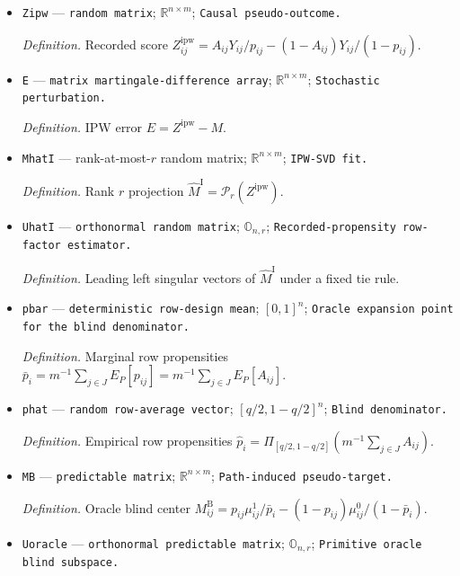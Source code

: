 \documentclass{article}
\begin{document}
\begin{itemize}
  \par\smallskip\noindent\emph{Definition.} Lower/reference scale \(b_{nm}=1\wedge[(B\sqrt{nm}/\lambda_{nm})\sqrt{\log(en)}\,b^0_{nm}]\).
  \item \texttt{Zipw} --- \texttt{random matrix}; \(\mathbb R^{n\times m}\); \texttt{Causal pseudo-\allowbreak{}outcome.}
  \par\smallskip\noindent\emph{Definition.} Recorded score \(Z^{\mathrm{ipw}}_{ij}=A_{ij}Y_{ij}/p_{ij}-(1-A_{ij})Y_{ij}/(1-p_{ij})\).
  \item \texttt{E} --- \texttt{matrix martingale-\allowbreak{}difference array}; \(\mathbb R^{n\times m}\); \texttt{Stochastic perturbation.}
  \par\smallskip\noindent\emph{Definition.} IPW error \(E=Z^{\mathrm{ipw}}-M\).
  \item \texttt{MhatI} --- rank-at-most-\(r\) random matrix; \(\mathbb R^{n\times m}\); \texttt{IPW-\allowbreak{}SVD fit.}
  \par\smallskip\noindent\emph{Definition.} Rank \(r\) projection \(\widehat M^{\mathrm I}=\mathcal P_r(Z^{\mathrm{ipw}})\).
  \item \texttt{UhatI} --- \texttt{orthonormal random matrix}; \(\mathbb O_{n,r}\); \texttt{Recorded-\allowbreak{}propensity row-\allowbreak{}factor estimator.}
  \par\smallskip\noindent\emph{Definition.} Leading left singular vectors of \(\widehat M^{\mathrm I}\) under a fixed tie rule.
  \item \texttt{pbar} --- \texttt{deterministic row-\allowbreak{}design mean}; \([0,1]^n\); \texttt{Oracle expansion point for the blind denominator.}
  \par\smallskip\noindent\emph{Definition.} Marginal row propensities \(\bar p_i=m^{-1}\sum_{j\in J}E_P[p_{ij}]=m^{-1}\sum_{j\in J}E_P[A_{ij}]\).
  \item \texttt{phat} --- \texttt{random row-\allowbreak{}average vector}; \([q/2,1-q/2]^n\); \texttt{Blind denominator.}
  \par\smallskip\noindent\emph{Definition.} Empirical row propensities \(\widehat p_i=\Pi_{[q/2,1-q/2]}(m^{-1}\sum_{j\in J}A_{ij})\).
  \item \texttt{MB} --- \texttt{predictable matrix}; \(\mathbb R^{n\times m}\); \texttt{Path-\allowbreak{}induced pseudo-\allowbreak{}target.}
  \par\smallskip\noindent\emph{Definition.} Oracle blind center \(M^{\mathrm B}_{ij}=p_{ij}\mu^1_{ij}/\bar p_i-(1-p_{ij})\mu^0_{ij}/(1-\bar p_i)\).
  \item \texttt{Uoracle} --- \texttt{orthonormal predictable matrix}; \(\mathbb O_{n,r}\); \texttt{Primitive oracle blind subspace.}

\end{itemize}
\end{document}

